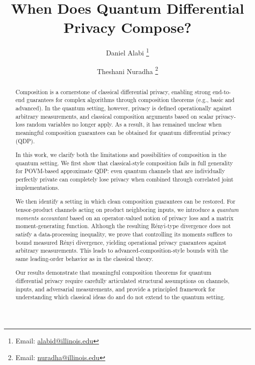 \documentclass[11pt]{article}
\theoremstyle{plain}
\theoremstyle{remark}
\begin{document}
\title{When Does Quantum Differential Privacy Compose?}

\author[1]{
Daniel Alabi
\thanks{Email: \url{alabid@illinois.edu}}
}

\author[2]{
Theshani Nuradha
\thanks{Email: \url{nuradha@illinois.edu}}
}

\date{}

\maketitle

\begin{abstract}
Composition is a cornerstone of classical differential privacy, enabling strong end-to-end guarantees for complex algorithms through composition theorems (e.g., basic and advanced).
In the quantum setting, however, privacy is defined operationally against arbitrary measurements, and classical composition arguments based on scalar privacy-loss random variables no longer apply.
As a result, it has remained unclear when meaningful composition guarantees can be obtained for quantum differential privacy (QDP).

In this work, we clarify both the limitations and possibilities of composition in the quantum setting.
We first show that classical-style composition fails in full generality for POVM-based approximate QDP: even quantum channels that are individually perfectly private can completely lose privacy when combined through correlated joint implementations.

We then identify a setting in which clean composition guarantees can be restored.
For tensor-product channels acting on product neighboring inputs, we introduce a \emph{quantum moments accountant} based on an operator-valued notion of privacy loss and a matrix moment-generating function.
Although the resulting R\'enyi-type divergence does not satisfy a data-processing inequality, we prove that controlling its moments suffices to bound measured R\'enyi divergence, yielding operational privacy guarantees against arbitrary measurements.
This leads to advanced-composition-style bounds with the same leading-order behavior as in the classical theory.

Our results demonstrate that meaningful composition theorems for quantum differential privacy require carefully articulated structural assumptions on channels, inputs, and adversarial measurements, and provide a principled framework for understanding which classical ideas do and do not extend to the quantum setting.
\end{abstract}
\end{document}
